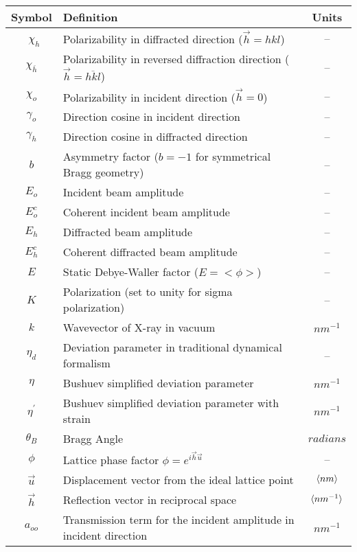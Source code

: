 \begin{table}
\begin{longtable}{|c|l|c|}
\hline
\textbf{Symbol}               		& \textbf{Definition} &\textbf{Units} \\
\hline\
$\chi_h$               & Polarizability in diffracted direction ($\vec{h} = hkl$)  &--\\
$\chi_{\overline{h}}$  & Polarizability in reversed diffraction direction ($\vec{h}=\overline{hkl}$) &--\\
$\chi_o$       		 & Polarizability in incident direction ($\vec{h} =0$) &--\\
$\gamma_o $      	 & Direction cosine in incident direction &--\\
$\gamma_h$		 & Direction cosine in diffracted direction &--\\
$b$           		& Asymmetry factor ($b = -1$ for symmetrical Bragg geometry) &--\\
$E_o$          		& Incident beam amplitude & --\\
$E^c_o$         	& Coherent incident beam amplitude &--\\
$E_h$          		& Diffracted beam amplitude &--\\
$E^c_h$        	 & Coherent diffracted beam amplitude &--\\
$E$          		 & Static Debye-Waller factor ($E=<\phi>$) &--\\  
$K$           		& Polarization (set to unity for sigma polarization) &--\\
$k$        		& Wavevector of X-ray in vacuum  &$ nm^{-1}$\\
$\eta_d$       	 & Deviation parameter in traditional dynamical formalism &--\\
$\eta$	 	& Bushuev simplified deviation parameter  &$ nm^{-1}$\\
$\eta^\prime$  	& Bushuev simplified deviation parameter with strain  &$ nm^{-1}$\\
$\theta_B$       	& Bragg Angle & $radians$ \\
$\phi$       	  	& Lattice phase factor $\phi = e^{i\vec{h} \vec{u}}$&--\\
$\vec{u}$        	& Displacement vector from the ideal lattice point & $\langle nm\rangle$\\
$\vec{h}$        	& Reflection vector in reciprocal space & $\langle nm^{-1}\rangle$\\
$a_{oo}$        & Transmission term for the incident amplitude in incident direction & $ nm^{-1}$ \\

\end{longtable}
\end{table}
